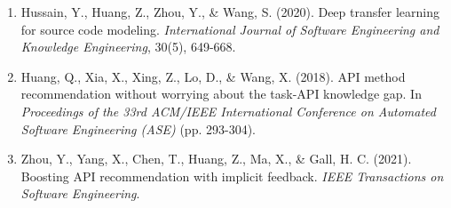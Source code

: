 \documentclass{article}
\begin{document}
\begin{enumerate}
    \item Hussain, Y., Huang, Z., Zhou, Y., \& Wang, S. (2020). Deep transfer learning for source code modeling. \textit{International Journal of Software Engineering and Knowledge Engineering}, 30(5), 649-668.
    \item Huang, Q., Xia, X., Xing, Z., Lo, D., \& Wang, X. (2018). API method recommendation without worrying about the task-API knowledge gap. In \textit{Proceedings of the 33rd ACM/IEEE International Conference on Automated Software Engineering (ASE)} (pp. 293-304).
    \item Zhou, Y., Yang, X., Chen, T., Huang, Z., Ma, X., \& Gall, H. C. (2021). Boosting API recommendation with implicit feedback. \textit{IEEE Transactions on Software Engineering}.
\end{enumerate}
\end{document}
